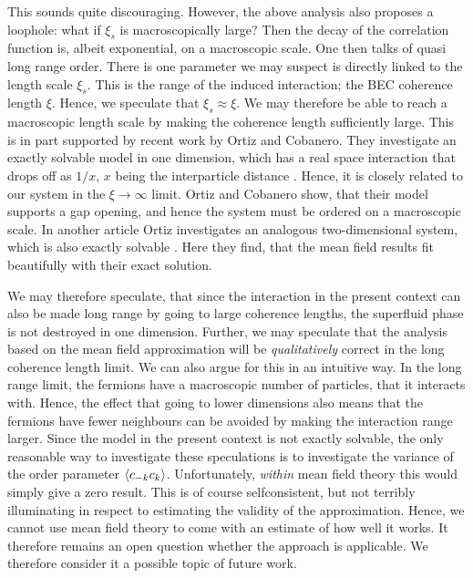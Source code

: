 This sounds quite discouraging. However, the above analysis also proposes a loophole: what if $\xi_s$ is macroscopically large? Then the decay of the correlation function is, albeit exponential, on a macroscopic scale. One then talks of quasi long range order. There is one parameter we may suspect is directly linked to the length scale $\xi_s$. This is the range of the induced interaction; the BEC coherence length $\xi$. Hence, we speculate that $\xi_s \approx \xi$. We may therefore be able to reach a macroscopic length scale by making the coherence length sufficiently large. This is in part supported by recent work by Ortiz and Cobanero. They investigate an exactly solvable model in one dimension, which has a real space interaction that drops off as $1 / x$, $x$ being the interparticle distance \cite{Ortiz.Beyondmeanfieldtheory}. Hence, it is closely related to our system in the $\xi \to \infty$ limit. Ortiz and Cobanero show, that their model supports a gap opening, and hence the system must be ordered on a macroscopic scale. In another article Ortiz investigates an analogous two-dimensional system, which is also exactly solvable \cite{Ortiz.pxpy}. Here they find, that the mean field results fit beautifully with their exact solution.

We may therefore speculate, that since the interaction in the present context can also be made long range by going to large coherence lengths, the superfluid phase is not destroyed in one dimension. Further, we may speculate that the analysis based on the mean field approximation will be \textit{qualitatively} correct in the long coherence length limit. We can also argue for this in an intuitive way. In the long range limit, the fermions have a macroscopic number of particles, that it interacts with. Hence, the effect that going to lower dimensions also means that the fermions have fewer neighbours can be avoided by making the interaction range larger. Since the model in the present context is not exactly solvable, the only reasonable way to investigate these speculations is to investigate the variance of the order parameter $\braket{c_{-k}c_k}$. Unfortunately, \textit{within} mean field theory this would simply give a zero result. This is of course selfconsistent, but not terribly illuminating in respect to estimating the validity of the approximation. Hence, we cannot use mean field theory to come with an estimate of how well it works. It therefore remains an open question whether the approach is applicable. We therefore consider it a possible topic of future work. 


